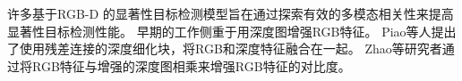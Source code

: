 \label{chpt1:title:rgbd_methods}
%
%
%
%
%
%
%
许多基于RGB-D 的显著性目标检测模型旨在通过探索有效的多模态相关性来提高显著性目标检测性能。
早期的工作侧重于用深度图增强RGB特征。
Piao等人提出了使用残差连接的深度细化块，将RGB和深度特征融合在一起。
Zhao等研究者通过将RGB特征与增强的深度图相乘来增强RGB特征的对比度。
